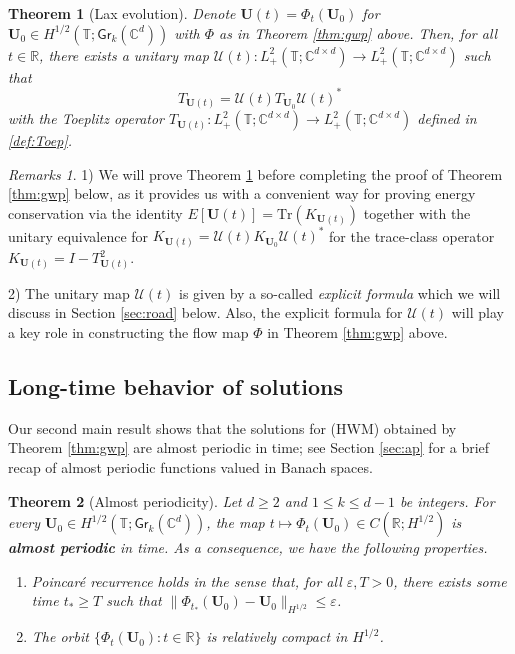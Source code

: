 \documentclass[10pt,reqno,a4paper]{amsart}
\newtheorem{thm}{Theorem}[section]
\theoremstyle{definition}
\theoremstyle{remark}
\theoremstyle{remark}
\newtheorem*{remarks*}{Remarks}
\numberwithin{equation}{section}
\newcommand{\C}{\mathbb{C}}
\newcommand{\R}{\mathbb{R}}
\newcommand{\T}{\mathbb{T}}
\newcommand{\eps}{\varepsilon}
\newcommand{\Ub}{\mathbf{U}}
\newcommand{\id}{I}
\newcommand{\Tr}{\mathrm{Tr}}
\newcommand{\Gr}{\mathsf{Gr}}
\newcommand{\Us}{\mathscr{U}}
\begin{document}
\begin{thm}[Lax evolution] \label{thm:lax}
Denote $\Ub(t) = \Phi_t(\Ub_0)$ for $\Ub_0 \in H^{1/2}(\T; \Gr_k(\C^d))$ with $\Phi$ as in Theorem \ref{thm:gwp} above. Then, for all $t \in \R$, there exists a unitary map $\Us(t) : L^2_+(\T; \C^{d \times d}) \to L^2_+(\T; \C^{d \times d})$ such that
$$
T_{\Ub(t)} = \Us(t) T_{\Ub_0} \Us(t)^*
$$
with the Toeplitz operator $T_{\Ub(t)} : L^2_+(\T; \C^{d \times d}) \to L^2_+(\T; \C^{d \times d})$ defined in \eqref{def:Toep}.
\end{thm}

\begin{remarks*}
1) We will prove Theorem \ref{thm:lax} before completing the proof of Theorem \ref{thm:gwp} below, as it provides us with a convenient way for proving energy conservation via the identity
$E[\Ub(t)] = \Tr(K_{\Ub(t)})$ together with the unitary equivalence for $K_{\Ub(t)} = \Us(t) K_{\Ub_0} \Us(t)^*$ for the trace-class operator $K_{\Ub(t)} = \id- T_{\Ub(t)}^2$. 

2) The unitary map $\Us(t)$ is given by a so-called {\em explicit formula} which we will discuss in Section \ref{sec:road} below. Also, the explicit formula for $\Us(t)$ will play a key role in constructing the flow map $\Phi$ in Theorem \ref{thm:gwp} above.
\end{remarks*}

\subsection{Long-time behavior of solutions}
Our second main result shows that the solutions for (HWM) obtained by Theorem \ref{thm:gwp} are almost periodic in time; see  Section \ref{sec:ap} for a brief recap of almost periodic functions valued in Banach spaces.

\begin{thm}[Almost periodicity] \label{thm:ap}
Let $d \geq 2$ and $1 \leq k \leq d-1$ be integers. For every  $\Ub_0 \in H^{1/2}(\T; \Gr_k(\C^d))$, the map $t \mapsto \Phi_t(\Ub_0) \in C(\R; H^{1/2})$  is \textbf{almost periodic} in time. As a consequence, we have the following properties.
\begin{enumerate}
\item[(i)]  Poincar\'e recurrence holds in the sense that, for all $\eps, T > 0$, there exists some time $t_* \geq T$ such that $\| \Phi_{t_*}(\Ub_0) - \Ub_0 \|_{H^{1/2}} \leq \eps$.
\item[(ii)] The orbit $\{ \Phi_t(\Ub_0) : t \in \R \}$ is relatively compact in $H^{1/2}$.
\end{enumerate}
\end{thm}
\end{document}
